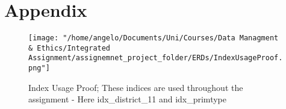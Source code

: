\documentclass[a4paper]{article}
\begin{document}
\section{Appendix}
\begin{figure}[htp]
		\centering
			\texttt{[image: "/home/angelo/Documents/Uni/Courses/Data Managment \& Ethics/Integrated Assignment/assignemnet\_project\_folder/ERDs/IndexUsageProof.png"]}
         \small
         \caption{Index Usage Proof; These indices are used throughout the assignment - Here idx\_district\_11 and idx\_primtype}
\end{figure}
\end{document}
